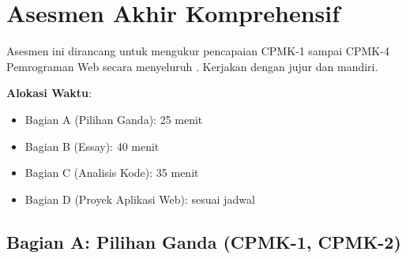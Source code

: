 \section{Asesmen Akhir Komprehensif}

Asesmen ini dirancang untuk mengukur pencapaian CPMK-1 sampai CPMK-4 Pemrograman Web secara menyeluruh \cite{mdn-learn}. Kerjakan dengan jujur dan mandiri.

\textbf{Alokasi Waktu}:
\begin{itemize}
  \item Bagian A (Pilihan Ganda): 25 menit
  \item Bagian B (Essay): 40 menit
  \item Bagian C (Analisis Kode): 35 menit
  \item Bagian D (Proyek Aplikasi Web): sesuai jadwal
\end{itemize}

\subsection{Bagian A: Pilihan Ganda (CPMK-1, CPMK-2)}

